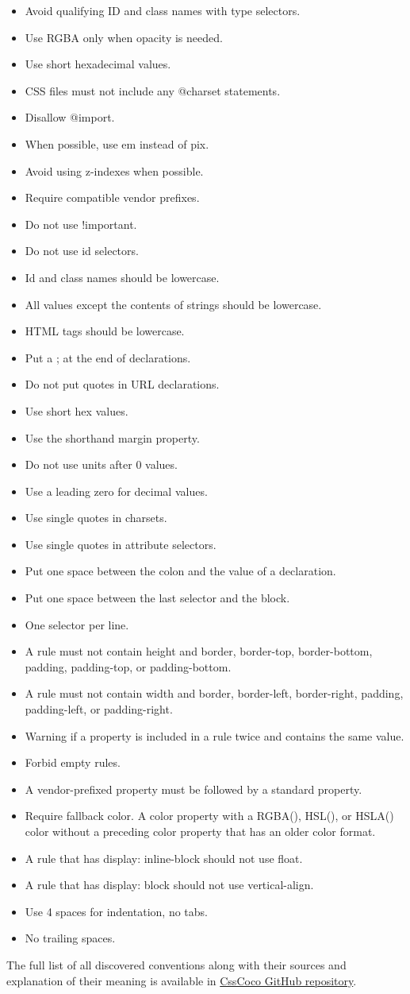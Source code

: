\begin{itemize} 
\item Avoid qualifying ID and class names with type selectors. 
\item Use RGBA only when opacity is needed.
\item Use short hexadecimal values. 
\item CSS files must not include any @charset statements.
\item Disallow @import. 
\item When possible, use em instead of pix. 
\item Avoid using z-indexes when possible. 
\item Require compatible vendor prefixes. 
\item Do not use !important. 
\item Do not use id selectors. 
\item Id and class names should be lowercase.
\item All values except the contents of strings should be lowercase.  
\item HTML tags should be lowercase.
\item Put a ; at the end of declarations. 
\item Do not put quotes in URL declarations.
\item Use short hex values.
\item Use the shorthand margin property.
\item Do not use units after 0 values.
\item Use a leading zero for decimal values.
\item Use single quotes in charsets.
\item Use single quotes in attribute selectors.
\item Put one space between the colon and the value of a declaration.
\item Put one space between the last selector and the block.
\item One selector per line.
\item A rule must not contain height and border, border-top, border-bottom, padding, padding-top, or padding-bottom.
\item A rule must not contain width and border, border-left, border-right, padding, padding-left, or padding-right.
\item Warning if a property is included in a rule twice and contains the same value.
\item Forbid empty rules.
\item A vendor-prefixed property must be followed by a standard property.
\item Require fallback color. A color property with a RGBA(), HSL(), or HSLA() color without a preceding color property that has an older color format.
\item A rule that has display: inline-block should not use float.
\item A rule that has display: block should not use vertical-align.
\item Use 4 spaces for indentation, no tabs.
\item No trailing spaces.
\end{itemize}

The full list of all discovered conventions along with their sources and explanation of their meaning is available in \href{https://github.com/boryanagoncharenko/CssCoco/blob/master/analysis.md}{CssCoco GitHub repository}.

